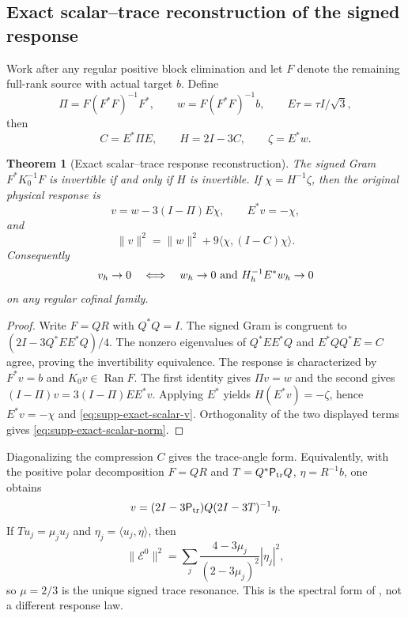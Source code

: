 \documentclass[11pt]{article}
\newtheorem{theorem}{Theorem}[section]
\numberwithin{equation}{section}
\theoremstyle{definition}
\theoremstyle{remark}
\newcommand{\Ran}{\operatorname{Ran}}
\begin{document}
\subsection{Exact scalar--trace reconstruction of the signed response}

Work after any regular positive block elimination and let $F$ denote the
remaining full-rank source with actual target $b$.  Define
\begin{equation}
 \Pi=F(F^*F)^{-1}F^*,\qquad
 w=F(F^*F)^{-1}b,
 \qquad E\tau=\tau I/\sqrt3,
 \label{eq:supp-exact-Pi-w}
\end{equation}
then
\begin{equation}
 C=E^*\Pi E,\qquad H=2I-3C,\qquad \zeta=E^*w.
 \label{eq:supp-exact-trace-data}
\end{equation}

\begin{theorem}[Exact scalar--trace response reconstruction]
\label{thm:supp-exact-scalar-reconstruction}
The signed Gram $F^*K_0^{-1}F$ is invertible if and only if $H$ is
invertible.  If $\chi=H^{-1}\zeta$, then the original physical response is
\begin{equation}
 v=w-3(I-\Pi)E\chi,\qquad E^*v=-\chi,
 \label{eq:supp-exact-scalar-v}
\end{equation}
and
\begin{equation}
 \|v\|^2=\|w\|^2+9\langle\chi,(I-C)\chi\rangle.
 \label{eq:supp-exact-scalar-norm}
\end{equation}
Consequently
\begin{equation}
 v_h\to0\quad\Longleftrightarrow\quad
 w_h\to0\ \hbox{and}\ H_h^{-1}E^*w_h\to0
 \label{eq:supp-exact-response-equivalence}
\end{equation}
on any regular cofinal family.
\end{theorem}
\begin{proof}
Write $F=QR$ with $Q^*Q=I$.  The signed Gram is congruent to
$(2I-3Q^*EE^*Q)/4$.  The nonzero eigenvalues of
$Q^*EE^*Q$ and $E^*QQ^*E=C$ agree, proving the invertibility equivalence.
The response is characterized by $F^*v=b$ and $K_0v\in\Ran F$.  The first
identity gives $\Pi v=w$ and the second gives
$(I-\Pi)v=3(I-\Pi)EE^*v$.  Applying $E^*$ yields
$H(E^*v)=-\zeta$, hence $E^*v=-\chi$ and
\eqref{eq:supp-exact-scalar-v}.  Orthogonality of the two displayed terms
gives \eqref{eq:supp-exact-scalar-norm}.
\end{proof}

Diagonalizing the compression $C$ gives the trace-angle form.  Equivalently,
with the positive polar decomposition $F=QR$ and
$T=Q^*\mathsf P_{\rm tr}Q$, $\eta=R^{-1}b$, one obtains
\begin{equation}
 v=(2I-3\mathsf P_{\rm tr})Q(2I-3T)^{-1}\eta.
 \label{eq:supp-exact-response-polar}
\end{equation}
If $Tu_j=\mu_ju_j$ and $\eta_j=\langle u_j,\eta\rangle$, then
\begin{equation}
 \|\mathcal E^0\|^2
 =\sum_j\frac{4-3\mu_j}{(2-3\mu_j)^2}|\eta_j|^2,
 \label{eq:supp-exact-physical-norm}
\end{equation}
so $\mu=2/3$ is the unique signed trace resonance.  This is the spectral
form of , not a different response
law.
\end{document}

